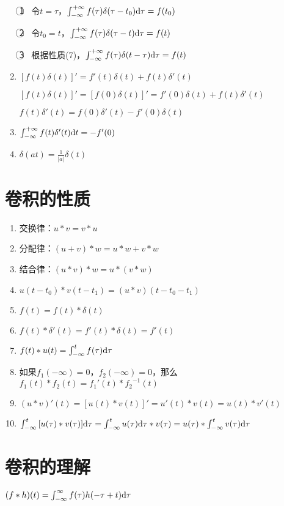 \documentclass[UTF8]{ctexart}
\begin{document}
\begin{enumerate}[align=left,label=(\arabic*)]
          \textcircled{1} \ 令$t=\tau$，$\int_{-\infty}^{+\infty}{f(\tau)\delta(\tau-t_0)\rm{d}\tau}=f(t_0)$ \par
          \textcircled{2} \ 令$t_0=t$，$\int_{-\infty}^{+\infty}{f(\tau)\delta(\tau-t)\rm{d}\tau}=f(t)$ \par
          \textcircled{3} \ 根据性质(7)，$\int_{-\infty}^{+\infty}{f(\tau)\delta(t-\tau)\rm{d}\tau}=f(t)$
    \item $[f(t)\delta(t)]'=f'(t)\delta(t)+f(t){\delta}'(t)$ \par
          $[f(t)\delta(t)]'=[f(0)\delta(t)]'=f'(0)\delta(t)+f(t){\delta}'(t)$ \par
          $f(t){\delta}'(t)=f(0){\delta}'(t)-f'(0)\delta(t)$
    \item $\int_{-\infty}^{+\infty}{f(t){\delta}'(t){\rm{d}}t}=-f'(0)$
    \item $\delta(at)=\frac{1}{|a|}\delta(t)$
\end{enumerate}

\section{卷积的性质}
\begin{enumerate}[align=left,label=(\arabic*)]
    \item 交换律：$u\ast{v}=v\ast{u}$
    \item 分配律：$(u+v)\ast{w}=u\ast{w}+v\ast{w}$
    \item 结合律：$(u\ast{v})\ast{w}=u\ast(v\ast{w})$
    \item $u(t-t_0)\ast{v(t-t_1)}=(u\ast{v})(t-t_0-t_1)$
    \item $f(t)=f(t)\ast\delta(t)$
    \item $f(t)\ast{\delta}'(t)=f'(t)\ast\delta(t)=f'(t)$
    \item $f(t)\ast{u(t)}=\int_{-\infty}^{t}{f(\tau){\rm{d}}\tau}$
    \item 如果$f_1(-\infty)=0$，$f_2(-\infty)=0$，那么$f_1(t)\ast{f_2(t)}={f_1}'(t)\ast{f_2}^{-1}(t)$
    \item $(u\ast{v})'(t)=[u(t)\ast{v(t)}]'=u'(t)\ast{v(t)}=u(t)\ast{v'(t)}$
    \item $\int_{-\infty}^{t}{[u(\tau)\ast{v(\tau)}]{\rm{d}}\tau}=\int_{-\infty}^{t}{u(\tau){\rm{d}}\tau}\ast{v(\tau)}={u(\tau)}\ast\int_{-\infty}^{t}{v(\tau){\rm{d}}\tau}$
\end{enumerate}

\section{卷积的理解}
$(f\ast{h})(t)=\int_{-\infty}^{\infty}{f(\tau)h(-\tau+t){\rm{d}}\tau}$
\end{document}

